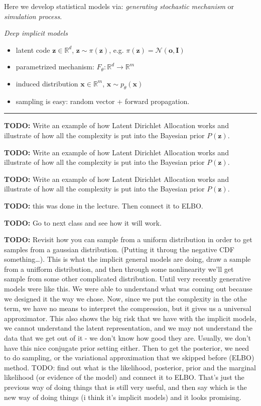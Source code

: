 \documentclass[a2paper,8pt]{extarticle}
\newcommand{\R}{\mathbb{R}}
\newcommand{\cN}{\mathcal{N}}
\newcommand{\Prob}[2][]{P_{#1}\left( #2 \right)}
\newcommand{\mat}[1]{\mathbf{#1}}
\renewcommand{\vec}[1]{\mathbf{#1}}
\newcommand{\vo}{\vec{o}}
\newcommand{\vx}{\vec{x}}
\newcommand{\vz}{\vec{z}}
\newcommand{\MI}{\mat{I}}
\newcommand{\todo}[1]{\textbf{TODO:} #1}
\newcommand{\todo}[1]{%
}
\newcommand{\sep}{\vspace{0pt}\noindent\hrule\vspace{0pt}}
\newcommand{\sep}{\vspace{5pt}\noindent\hrule\vspace{5pt}}
\begin{document}
\begin{landscape}
\begin{multicols*}{7}
Here we develop statistical models via: \emph{generating stochastic mechanism}
or \emph{simulation process}.

\emph{Deep implicit models}
\begin{itemize}
  \item latent code $\vz\in\R^d$, $\vz\sim\pi(\vz)$, e.g.
  $\pi(\vz)=\cN(\vo,\MI)$
  \item parametrized mechanism: $F_\theta\colon\R^d\to\R^m$
  \item induced distribution $\vx\in\R^m$, $\vx\sim p_\theta(\vx)$
  \item sampling is easy: random vector + forward propagation.
\end{itemize}

\sep

\todo{Write an example of how Latent Dirichlet Allocation works and illustrate
of how all the complexity is put into the Bayesian prior $\Prob{\vz}$. }

\todo{Write an example of how Latent Dirichlet Allocation works and illustrate
of how all the complexity is put into the Bayesian prior $\Prob{\vz}$. }

\todo{Write an example of how Latent Dirichlet Allocation works and illustrate
of how all the complexity is put into the Bayesian prior $\Prob{\vz}$. }

\todo{this was done in the lecture. Then connect it to ELBO}.

\todo{Go to next class and see how it will work.}

\todo{Revisit how you can sample from a uniform distribution in order to get
samples from a gaussian distribution. (Putting it throug the negative CDF
something\ldots). This is what the implicit general models are doing, draw a
sample from a unifform distribution, and then through some nonlinearity we'll
get sample from some other complicated distribution. Until very recently
generative models were like this. We were able to understand what was coming
out because we designed it the way we chose. Now, since we put the complexity
in the othe term, we have no means to interpret the compression, but it gives
us a universal approximator. This also shows the big risk that we have with the
implicit models, we cannot understand the latent representation, and we may not
understand the data that we get out of it - we don't know how good they are.
Usually, we don't have this nice conjugate prior setting either. Then to get
the posterior, we need to do sampling, or the variational approximation that we
skipped before (ELBO) method. TODO: find out what is the likelihood, posterior,
prior and the marginal likelihood (or evidence of the model) and connect it to
ELBO. That's just the previous way of doing things that is still very useful,
and then say which is the new way of doing things (i think it's implicit
models) and it looks promising.}


\end{multicols*}
\end{landscape}
\end{document}
